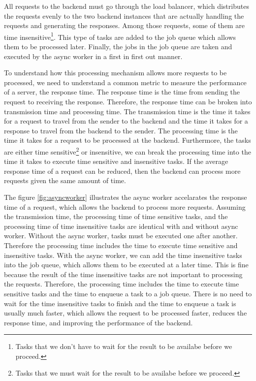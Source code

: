 \documentclass[../thesis.tex]{subfiles}
\begin{document}
All requests to the backend must go through the load balancer, which distributes the requests evenly to the two backend instances that are actually handling the requests and generating the responses. Among those requests, some of them are time insensitive\footnote{Tasks that we don't have to wait for the result to be availabe before we proceed.}. This type of tasks are added to the job queue which allows them to be processed later. Finally, the jobs in the job queue are taken and executed by the async worker in a first in first out manner. 

To understand how this processing mechanism allows more requests to be processed, we need to understand a common metric to measure the performance of a server, the response time. The response time is the time from sending the request to receiving the response. Therefore, the response time can be broken into transmission time and processing time. The transmission time is the time it takes for a request to travel from the sender to the backend and the time it takes for a response to travel from the backend to the sender. The processing time is the time it takes for a request to be processed at the backend. Furthermore, the tasks are either time sensitive\footnote{Tasks that we must wait for the result to be availabe before we proceed.} or insensitive, we can break the processing time into the time it takes to execute time sensitive and insensitive tasks. If the average response time of a request can be reduced, then the backend can process more requests given the same amount of time.

The figure \ref{fig:asyncworker} illustrates the async worker accelarates the response time of a request, which allows the backend to process more requests. Assuming the transmission time, the processing time of time sensitive tasks, and the processing time of time insensitive tasks are identical with and without async worker. Without the async worker, tasks must be executed one after another. Therefore the processing time includes the time to execute time sensitive and insensitive tasks. With the async worker, we can add the time insensitive tasks into the job queue, which allows them to be executed at a later time. This is fine because the result of the time insensitive tasks are not important to processing the requests. Therefore, the processing time includes the time to execute time sensitive tasks and the time to enqueue a task to a job queue. There is no need to wait for the time insensitive tasks to finish and the time to enqueue a task is usually much faster, which allows the request to be processed faster, reduces the response time, and improving the performance of the backend. 
\end{document}
